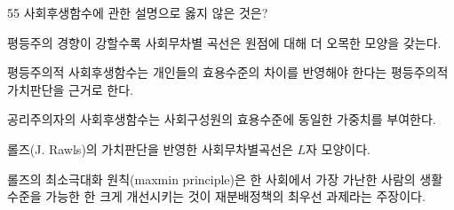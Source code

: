 \begin{question}{55}
사회후생함수에 관한 설명으로 옳지 않은 것은?
\begin{choices}
  \item 평등주의 경향이 강할수록 사회무차별 곡선은 원점에 대해 더 오목한 모양을 갖는다.
  \item 평등주의적 사회후생함수는 개인들의 효용수준의 차이를 반영해야 한다는 평등주의적 가치판단을 근거로 한다.
  \item 공리주의자의 사회후생함수는 사회구성원의 효용수준에 동일한 가중치를 부여한다.
  \item 롤즈(J. Rawls)의 가치판단을 반영한 사회무차별곡선은 $L$자 모양이다.
  \item 롤즈의 최소극대화 원칙(maxmin principle)은 한 사회에서 가장 가난한 사람의 생활 수준을 가능한 한 크게 개선시키는 것이 재분배정책의 최우선 과제라는 주장이다.
\end{choices}
\end{question}
